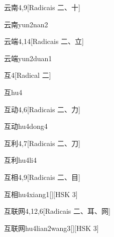 \begin{entry}{云南}{4,9}[Radicais ⼆、⼗]
  \begin{phonetics}{云南}{yun2nan2}
  \end{phonetics}
\end{entry}

\begin{entry}{云端}{4,14}[Radicais ⼆、⽴]
  \begin{phonetics}{云端}{yun2duan1}
  \end{phonetics}
\end{entry}

\begin{entry}{互}{4}[Radical ⼆]
  \begin{phonetics}{互}{hu4}
  \end{phonetics}
\end{entry}

\begin{entry}{互动}{4,6}[Radicais ⼆、⼒]
  \begin{phonetics}{互动}{hu4dong4}
  \end{phonetics}
\end{entry}

\begin{entry}{互利}{4,7}[Radicais ⼆、⼑]
  \begin{phonetics}{互利}{hu4li4}
  \end{phonetics}
\end{entry}

\begin{entry}{互相}{4,9}[Radicais ⼆、⽬]
  \begin{phonetics}{互相}{hu4xiang1}[][HSK 3]
  \end{phonetics}
\end{entry}

\begin{entry}{互联网}{4,12,6}[Radicais ⼆、⽿、⽹]
  \begin{phonetics}{互联网}{hu4lian2wang3}[][HSK 3]
  \end{phonetics}
\end{entry}

